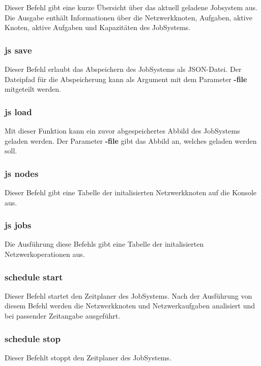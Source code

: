 \documentclass[12pt,a4paper]{report}
\begin{document}
\begin{onehalfspace}
Dieser Befehl gibt eine kurze Übersicht über das aktuell geladene Jobsystem aus. Die Ausgabe enthält Informationen über die Netzwerkknoten, Aufgaben, aktive Knoten, aktive Aufgaben und Kapazitäten des JobSystems.

\subsubsection{js save}

Dieser Befehl erlaubt das Abspeichern des JobSystems als JSON-Datei. Der Dateipfad für die Abspeicherung kann als Argument mit dem Parameter \textbf{-file} mitgeteilt werden.

\subsubsection{js load}

Mit dieser Funktion kann ein zuvor abgespeichertes Abbild des JobSystems geladen werden. Der Parameter \textbf{-file} gibt das Abbild an, welches geladen werden soll.

\subsubsection{js nodes}

Dieser Befehl gibt eine Tabelle der initalisierten Netzwerkknoten auf die Konsole aus.

\subsubsection{js jobs}

Die Ausführung diese Befehls gibt eine Tabelle der initalisierten Netzwerkoperationen aus.

\subsubsection{schedule start}

Dieser Befehl startet den Zeitplaner des JobSystems. Nach der Ausführung von diesem Befehl werden die Netzwerkknoten und Netzwerkaufgaben analisiert und bei passender Zeitangabe ausgeführt.

\subsubsection{schedule stop}

Dieser Befehlt stoppt den Zeitplaner des JobSystems.


\end{onehalfspace}
\end{document}
